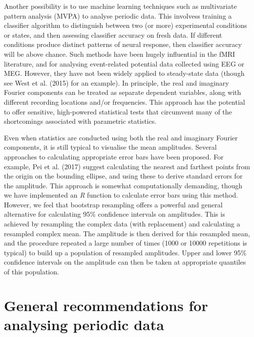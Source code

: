 \documentclass[]{article}
\begin{document}
Another possibility is to use machine learning techniques such as multivariate pattern analysis (MVPA) to analyse periodic data. This involvess training a classifier algorithm to distinguish between two (or more) experimental conditions or states, and then assessing classifier accuracy on fresh data. If different conditions produce distinct patterns of neural response, then classifier accuracy will be above chance. Such methods have been hugely influential in the fMRI literature, and for analysing event-related potential data collected using EEG or MEG. However, they have not been widely applied to steady-state data (though see West et al. (2015) for an example). In principle, the real and imaginary Fourier components can be treated as separate dependent variables, along with different recording locations and/or frequencies. This approach has the potential to offer sensitive, high-powered statistical tests that circumvent many of the shortcomings associated with parametric statistics.

Even when statistics are conducted using both the real and imaginary Fourier components, it is still typical to visualise the mean amplitudes. Several approaches to calculating appropriate error bars have been proposed. For example, Pei et al. (2017) suggest calculating the nearest and farthest points from the origin on the bounding ellipse, and using these to derive standard errors for the amplitude. This approach is somewhat computationally demanding, though we have implemented an \emph{R} function to calculate error bars using this method. However, we feel that bootstrap resampling offers a powerful and general alternative for calculating 95\% confidence intervals on amplitudes. This is achieved by resampling the complex data (with replacement) and calculating a resampled complex mean. The amplitude is then derived for this resampled mean, and the procedure repeated a large number of times (1000 or 10000 repetitions is typical) to build up a population of resampled amplitudes. Upper and lower 95\% confidence intervals on the amplitude can then be taken at appropriate quantiles of this population.

\hypertarget{general-recommendations-for-analysing-periodic-data}{%
\section{General recommendations for analysing periodic data}\label{general-recommendations-for-analysing-periodic-data}}
\end{document}
